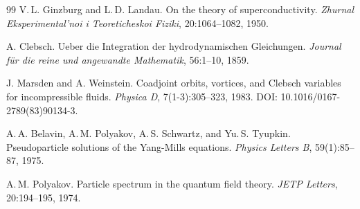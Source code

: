 \documentclass[11pt,a4paper]{article}
\begin{document}
\begin{thebibliography}{99}
V.\,L. Ginzburg and L.\,D. Landau.
\newblock On the theory of superconductivity.
\newblock \textit{Zhurnal Eksperimental'noi i Teoreticheskoi Fiziki}, 20:1064--1082, 1950.

A. Clebsch.
\newblock Ueber die Integration der hydrodynamischen Gleichungen.
\newblock \textit{Journal für die reine und angewandte Mathematik}, 56:1--10, 1859.

J. Marsden and A. Weinstein.
\newblock Coadjoint orbits, vortices, and Clebsch variables for incompressible fluids.
\newblock \textit{Physica D}, 7(1-3):305--323, 1983.
\newblock DOI: 10.1016/0167-2789(83)90134-3.

A.\,A. Belavin, A.\,M. Polyakov, A.\,S. Schwartz, and Yu.\,S. Tyupkin.
\newblock Pseudoparticle solutions of the Yang-Mills equations.
\newblock \textit{Physics Letters B}, 59(1):85--87, 1975.

A.\,M. Polyakov.
\newblock Particle spectrum in the quantum field theory.
\newblock \textit{JETP Letters}, 20:194--195, 1974.

\end{thebibliography}
\end{document}
